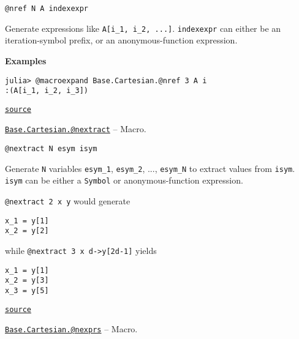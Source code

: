 \begin{adjustwidth}{2em}{0pt}


\begin{verbatim}
@nref N A indexexpr
\end{verbatim}

Generate expressions like \texttt{A[i\_1, i\_2, ...]}. \texttt{indexexpr} can either be an iteration-symbol prefix, or an anonymous-function expression.

\textbf{Examples}


\begin{verbatim}
julia> @macroexpand Base.Cartesian.@nref 3 A i
:(A[i_1, i_2, i_3])
\end{verbatim}



\href{https://github.com/JuliaLang/julia/blob/9058264a69f9efc1af805c4473c946f87859b731/base/cartesian.jl#L72-L83}{\texttt{source}}


\end{adjustwidth}
\hypertarget{5592996802344748158}{}
\hyperlink{5592996802344748158}{\texttt{Base.Cartesian.@nextract}}  -- {Macro.}

\begin{adjustwidth}{2em}{0pt}


\begin{verbatim}
@nextract N esym isym
\end{verbatim}

Generate \texttt{N} variables \texttt{esym\_1}, \texttt{esym\_2}, ..., \texttt{esym\_N} to extract values from \texttt{isym}. \texttt{isym} can be either a \texttt{Symbol} or anonymous-function expression.

\texttt{@nextract 2 x y} would generate


\begin{lstlisting}
x_1 = y[1]
x_2 = y[2]
\end{lstlisting}

while \texttt{@nextract 3 x d->y[2d-1]} yields


\begin{lstlisting}
x_1 = y[1]
x_2 = y[3]
x_3 = y[5]
\end{lstlisting}



\href{https://github.com/JuliaLang/julia/blob/9058264a69f9efc1af805c4473c946f87859b731/base/cartesian.jl#L132-L149}{\texttt{source}}


\end{adjustwidth}
\hypertarget{17386123129446980507}{}
\hyperlink{17386123129446980507}{\texttt{Base.Cartesian.@nexprs}}  -- {Macro.}

